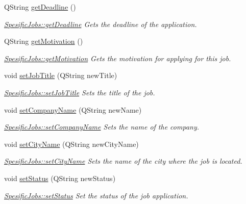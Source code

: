 \begin{DoxyCompactItemize}
Q\+String \hyperlink{class_spesific_jobs_a4744022c02271fabfb7fca0015896c09}{get\+Deadline} ()
\begin{DoxyCompactList}\small\item\em \hyperlink{class_spesific_jobs_a4744022c02271fabfb7fca0015896c09}{Spesific\+Jobs\+::get\+Deadline} Gets the deadline of the application. \end{DoxyCompactList}\item 
Q\+String \hyperlink{class_spesific_jobs_a73406f6204c990c3fa3c7b9d16f1b0b9}{get\+Motivation} ()
\begin{DoxyCompactList}\small\item\em \hyperlink{class_spesific_jobs_a73406f6204c990c3fa3c7b9d16f1b0b9}{Spesific\+Jobs\+::get\+Motivation} Gets the motivation for applying for this job. \end{DoxyCompactList}\item 
void \hyperlink{class_spesific_jobs_abb4d8e45e0a2be8197ef03057fc5c714}{set\+Job\+Title} (Q\+String new\+Title)
\begin{DoxyCompactList}\small\item\em \hyperlink{class_spesific_jobs_abb4d8e45e0a2be8197ef03057fc5c714}{Spesific\+Jobs\+::set\+Job\+Title} Sets the title of the job. \end{DoxyCompactList}\item 
void \hyperlink{class_spesific_jobs_aeacc56572911219fddf2f1439a70ed74}{set\+Company\+Name} (Q\+String new\+Name)
\begin{DoxyCompactList}\small\item\em \hyperlink{class_spesific_jobs_aeacc56572911219fddf2f1439a70ed74}{Spesific\+Jobs\+::set\+Company\+Name} Sets the name of the company. \end{DoxyCompactList}\item 
void \hyperlink{class_spesific_jobs_a67b162aa9ad12ed8ffba061edff96cdf}{set\+City\+Name} (Q\+String new\+City\+Name)
\begin{DoxyCompactList}\small\item\em \hyperlink{class_spesific_jobs_a67b162aa9ad12ed8ffba061edff96cdf}{Spesific\+Jobs\+::set\+City\+Name} Sets the name of the city where the job is located. \end{DoxyCompactList}\item 
void \hyperlink{class_spesific_jobs_a439307a28196221b7e3877983077812f}{set\+Status} (Q\+String new\+Status)
\begin{DoxyCompactList}\small\item\em \hyperlink{class_spesific_jobs_a439307a28196221b7e3877983077812f}{Spesific\+Jobs\+::set\+Status} Set the status of the job application. \end{DoxyCompactList}\item 

\end{DoxyCompactItemize}
